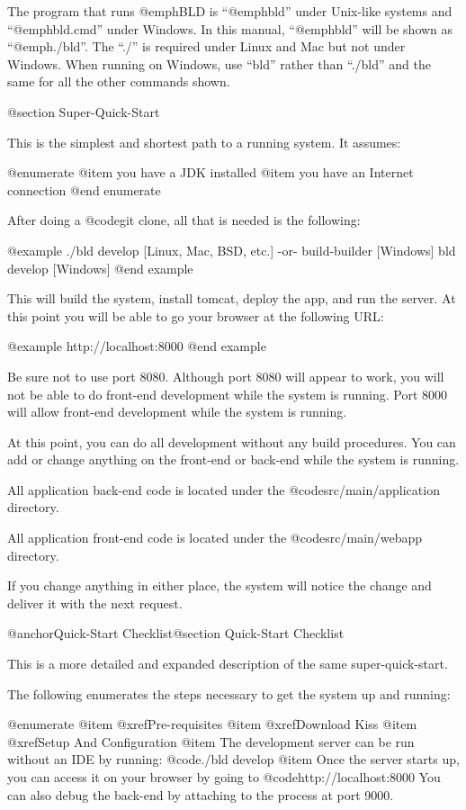 The program that runs @emph{BLD} is ``@emph{bld}'' under Unix-like
systems and ``@emph{bld.cmd}'' under Windows.  In this manual,
``@emph{bld}'' will be shown as ``@emph{./bld}''.  The ``./'' is
required under Linux and Mac but not under Windows.  When running on
Windows, use ``bld'' rather than ``./bld'' and the same for all the
other commands shown.

@section Super-Quick-Start

This is the simplest and shortest path to a running system.  It assumes:

@enumerate
@item
you have a JDK installed
@item
you have an Internet connection
@end enumerate

After doing a @code{git clone}, all that is needed is the following:

@example
    ./bld  develop                      [Linux, Mac, BSD, etc.]
         -or-
    build-builder                       [Windows]
    bld  develop                        [Windows]
@end example

This will build the system, install tomcat, deploy the app, and run
the server.  At this point you will be able to go your browser at the
following URL:

@example
    http://localhost:8000
@end example

Be sure not to use port 8080.  Although port 8080 will appear to work,
you will not be able to do front-end development while the system is
running.  Port 8000 will allow front-end development while the system
is running.

At this point, you can do all development without any build
procedures.  You can add or change anything on the front-end or
back-end while the system is running.

All application back-end code is located under the @code{src/main/application}
directory.

All application front-end code is located under the @code{src/main/webapp}
directory.

If you change anything in either place, the system will notice the change 
and deliver it with the next request.


@anchor{Quick-Start Checklist}@section Quick-Start Checklist

This is a more detailed and expanded description of the same
super-quick-start.

The following enumerates the steps necessary to get the system up and running:

@enumerate
@item
@xref{Pre-requisites}
@item
@xref{Download Kiss}
@item
@xref{Setup And Configuration}
@item
The development server can be run without an IDE by running: @code{./bld develop}
@item
Once the server starts up, you can access it on your browser by going to 
@code{http://localhost:8000}  You can also debug the back-end by
attaching to the process at port 9000.

